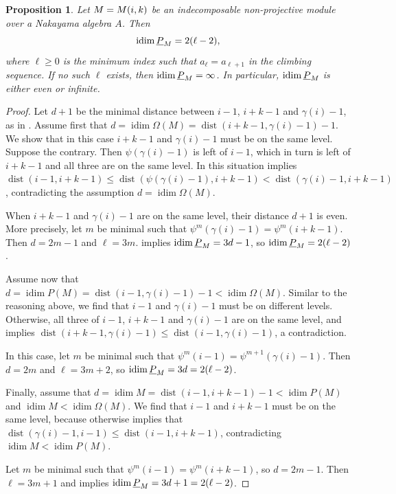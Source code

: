 \documentclass[a4paper]{amsart}
\newtheorem{proposition}[theorem]{Proposition}
\theoremstyle{definition}
\theoremstyle{remark}
\numberwithin{equation}{theorem}
\newcommand{\idim}{\operatorname{idim}}
\newcommand{\dist}{\operatorname{dist}}
\begin{document}
\begin{proposition}\label{prop:even}
  Let $M = \mik$ be an indecomposable non-projective module over a Nakayama algebra $ A $. Then
    \[\stabidim = 2(\ell - 2),\]
  where $\ell \geq 0$ is the minimum index such that $a_\ell = a_{\ell + 1}$ in the climbing sequence. If no such $\ell$ exists, then $\stabidim = \infty$.
  In particular, $\stabidim$ is either even or infinite.
\end{proposition}
\begin{proof}
  Let $d+1$ be the minimal distance between $i-1$, $i+k-1$ and
  $\gamma(i)-1$, as in .
  Assume first
  that $d = \idim\Omega(M) = \dist(i+k-1, \gamma(i)-1) - 1$.
  We
  show that in this case $i+k-1$ and $\gamma(i)-1$
  must be on the
  same level.
  Suppose the contrary.
  Then $\psi(\gamma(i)-1)$ is
  left of $i-1$, which in turn is left of $i+k-1$ and all three are
  on the same level.
  In this situation  implies
  $\dist(i-1, i+k-1)\leq\dist(\psi(\gamma(i)-1), i+k-1) <
  \dist(\gamma(i)-1, i+k-1)$, contradicting the assumption
  $d=\idim\Omega(M)$.

  When $i+k-1$ and $\gamma(i)-1$ are on the same level, their distance $d+1$ is even.  More precisely, let $m$ be minimal such that
  $\psi^m(\gamma(i)-1) = \psi^m(i+k-1)$. Then $d = 2m-1$ and $\ell = 3m$.
   implies $\stabidim = 3d-1$, so $\stabidim = 2(\ell-2)$.

  Assume now that
  $d = \idim P(M) = \dist(i-1, \gamma(i)-1) - 1 < \idim\Omega(M)$.
  Similar to the reasoning above, we find that $i-1$ and
  $\gamma(i)-1$ must be on different levels.
  Otherwise, all three of
  $i-1$, $i+k-1$ and $\gamma(i)-1$ are on the same level, and
   implies
  $\dist(i+k-1, \gamma(i)-1)\leq\dist(i-1, \gamma(i)-1)$, a
  contradiction.

  In this case, let $m$ be minimal such that
  $\psi^m(i-1) = \psi^{m+1}(\gamma(i)-1)$.
  Then $d = 2m$ and $\ell=3m+2$, so $\stabidim = 3d = 2(\ell-2)$.

  Finally, assume that
  $d = \idim M = \dist(i-1, i+k-1) - 1 < \idim P(M)$ and $\idim M < \idim\Omega(M)$.
  We find that
  $i-1$ and $i+k-1$ must be on the same level, because otherwise
   implies that
  $\dist(\gamma(i)-1, i-1)\leq\dist(i-1, i+k-1)$, contradicting
  $\idim M < \idim P(M)$.

  Let $m$ be minimal such that $\psi^m(i-1) = \psi^m(i+k-1)$, so $d=2m-1$. Then $\ell=3m+1$ and  implies $\stabidim = 3d + 1 = 2(\ell-2)$.
\end{proof}
\end{document}
